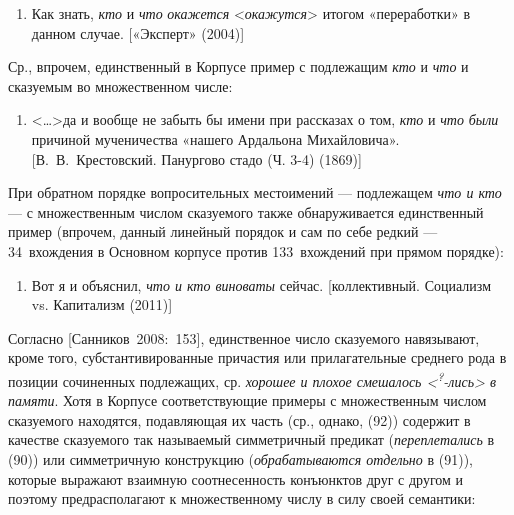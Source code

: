 \begin{enumerate}
\def\labelenumi{(\arabic{enumi})}
\setcounter{enumi}{86}
\item
  Как знать, \textit{кто} и \textit{что} \textit{окажется}
  \textless*\textit{окажутся}\textgreater{} итогом «переработки» в данном
  случае. {[}«Эксперт» (2004){]}
\end{enumerate}

Ср., впрочем, единственный в Корпусе пример с подлежащим \textit{кто} и
\textit{что} и сказуемым во множественном числе:

\begin{enumerate}
\def\labelenumi{(\arabic{enumi})}
\setcounter{enumi}{87}
\item
  \textless\ldots\textgreater да и вообще не забыть бы имени при
  рассказах о том, \textit{кто} и \textit{что} \textit{были} причиной
  мученичества «нашего Ардальона Михайловича». {[}В.~В.~Крестовский.
  Панургово стадо (Ч. 3-4) (1869){]}
\end{enumerate}

При обратном порядке вопросительных местоимений --- подлежащем \textit{что
и кто} --- с множественным числом сказуемого также обнаруживается
единственный пример (впрочем, данный линейный порядок и сам по себе
редкий --- 34~вхождения в Основном корпусе против 133~вхождений при
прямом порядке):

\begin{enumerate}
\def\labelenumi{(\arabic{enumi})}
\setcounter{enumi}{88}
\item
  Вот я и объяснил, \textit{что и кто виноваты} сейчас. {[}коллективный.
  Социализм vs. Капитализм (2011){]}
\end{enumerate}

Согласно {[}Санников~2008:~153{]}, единственное число сказуемого
навязывают, кроме того, субстантивированные причастия или прилагательные
среднего рода в позиции сочиненных подлежащих, ср. \textit{хорошее и
плохое смешалось \textless{}\textsuperscript{?}-лись\textgreater{} в
памяти}. Хотя в Корпусе соответствующие примеры с множественным числом
сказуемого находятся, подавляющая их часть (ср., однако, (92)) содержит
в качестве сказуемого так называемый симметричный предикат
(\textit{переплетались} в (90)) или симметричную конструкцию
(\textit{обрабатываются отдельно} в (91)), которые выражают взаимную
соотнесенность конъюнктов друг с другом и поэтому предрасполагают к
множественному числу в силу своей семантики:

